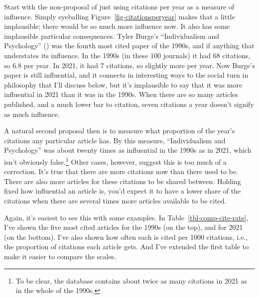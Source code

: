 \documentclass[
  12pt,
  letterpaper,
  DIV=11,
  numbers=noendperiod]{scrartcl}
\begin{document}
Start with the non-proposal of just using citations per year as a
measure of influence. Simply eyeballing
Figure~\ref{fig-citationsperyear} makes that a little implausible; there
would be so much more influence now. It also has some implausible
particular consequences. Tyler Burge's ``Individualism and Psychology''
() was the fourth most
cited paper of the 1990s, and if anything that understates its
influence. In the 1990s (in these 100 journals) it had 68 citations, so
6.8 per year. In 2021, it had 7 citations, so slightly more per year.
Now Burge's paper is still influential, and it connects in interesting
ways to the social turn in philosophy that I'll discuss below, but it's
implausible to say that it was more influential in 2021 than it was in
the 1990s. When there are so many articles published, and a much lower
bar to citation, seven citations a year doesn't signify as much
influence.

A natural second proposal then is to measure what proportion of the
year's citations any particular article has. By this measure,
``Individualism and Psychology'' was about twenty times as influential
in the 1990s as in 2021, which isn't obviously false.\footnote{To be
  clear, the database contains about twice as many citations in 2021 as
  in the whole of the 1990s.} Other cases, however, suggest this is too
much of a correction. It's true that there are more citations now than
there used to be. There are also more articles for these citations to be
shared between. Holding fixed how influential an article is, you'd
expect it to have a lower share of the citations when there are several
times more articles available to be cited.

Again, it's easiest to see this with some examples. In
Table~\ref{tbl-comp-cite-rate}, I've shown the five most cited articles
for the 1990s (on the top), and for 2021 (on the bottom). I've also
shown how often each is cited per 1000 citations, i.e., the proportion
of citations each article gets. And I've extended the first table to
make it easier to compare the scales.
\end{document}
